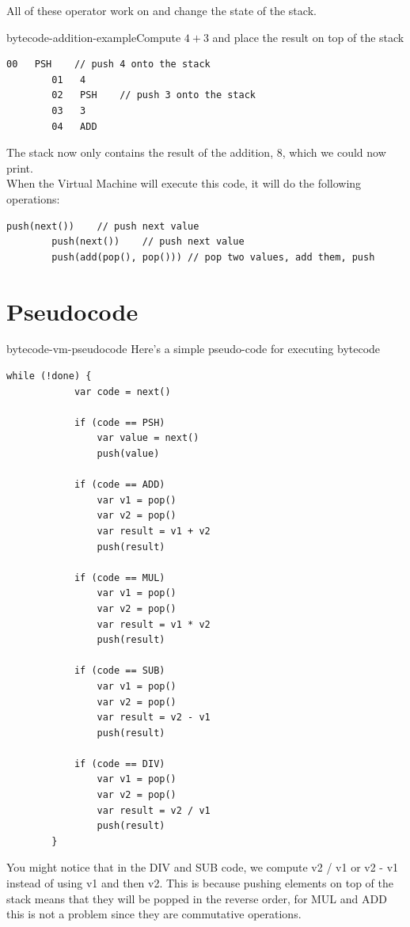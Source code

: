 \documentclass[preview]{standalone}
\begin{document}
\begin{plainhtml}
    All of these operator work on and change the state of the stack.
\end{plainhtml}

\begin{snippetexample}{bytecode-addition-example}{Compute \(4+3\) and place the result on top of the stack}
    \begin{lstlisting}[style=generic]
        00   PSH    // push 4 onto the stack
        01   4
        02   PSH    // push 3 onto the stack
        03   3
        04   ADD
    \end{lstlisting}
    
    The stack now only contains the result of the addition, 8, which we could now print.
    \\
    When the Virtual Machine will execute this code, it will do the following operations:
    
    \begin{lstlisting}[style=generic]
        push(next())    // push next value
        push(next())    // push next value
        push(add(pop(), pop())) // pop two values, add them, push
    \end{lstlisting}
\end{snippetexample}

\section{Pseudocode}

\begin{snippet}{bytecode-vm-pseudocode}
    Here's a simple pseudo-code for executing bytecode
    
    \begin{lstlisting}[style=generic]
        while (!done) {
            var code = next()
        
            if (code == PSH)
                var value = next()
                push(value)
        
            if (code == ADD)
                var v1 = pop()
                var v2 = pop()
                var result = v1 + v2
                push(result)
        
            if (code == MUL)
                var v1 = pop()
                var v2 = pop()
                var result = v1 * v2
                push(result)
        
            if (code == SUB)
                var v1 = pop()
                var v2 = pop()
                var result = v2 - v1
                push(result)
        
            if (code == DIV)
                var v1 = pop()
                var v2 = pop()
                var result = v2 / v1
                push(result)
        }
    \end{lstlisting}
    
    You might notice that in the DIV and SUB code, we compute v2 / v1 or v2 - v1 instead of using v1 and then v2.
    This is because pushing elements on top of the stack means that they will be popped in the reverse order, for MUL and ADD
    this is not a problem since they are commutative operations.
\end{snippet}
\end{document}
